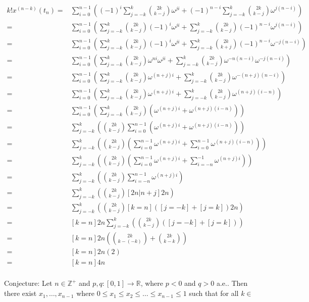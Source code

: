 \documentclass{article}
\begin{document}
\begin{align*}
  k!x^{(n-k)}(t_n) =& \sum_{i=0}^{n-1} \left((-1)^i\sum_{j=-k}^k\binom{2k}{k-j}\omega^{ji} + (-1)^{n-i}\sum_{j=-k}^k\binom{2k}{k-j}\omega^{j(n-i)}\right) \\
  =& \sum_{i=0}^{n-1} \left(\sum_{j=-k}^k\binom{2k}{k-j}(-1)^i\omega^{ji} + \sum_{j=-k}^k\binom{2k}{k-j}(-1)^{n-i}\omega^{j(n-i)}\right) \\
  =& \sum_{i=0}^{n-1} \left(\sum_{j=-k}^k\binom{2k}{k-j}(-1)^i\omega^{ji} + \sum_{j=-k}^k\binom{2k}{k+j}(-1)^{n-i}\omega^{-j(n-i)}\right) \\
  =& \sum_{i=0}^{n-1} \left(\sum_{j=-k}^k\binom{2k}{k-j}\omega^{ni}\omega^{ji} + \sum_{j=-k}^k\binom{2k}{k-j}\omega^{-n(n-i)}\omega^{-j(n-i)}\right) \\
  =& \sum_{i=0}^{n-1} \left(\sum_{j=-k}^k\binom{2k}{k-j}\omega^{(n+j)i} + \sum_{j=-k}^k\binom{2k}{k-j}\omega^{-(n+j)(n-i)}\right) \\
  =& \sum_{i=0}^{n-1} \left(\sum_{j=-k}^k\binom{2k}{k-j}\omega^{(n+j)i} + \sum_{j=-k}^k\binom{2k}{k-j}\omega^{(n+j)(i-n)}\right) \\
  =& \sum_{i=0}^{n-1} \left(\sum_{j=-k}^k\binom{2k}{k-j}\left(\omega^{(n+j)i} + \omega^{(n+j)(i-n)}\right)\right) \\
  =& \sum_{j=-k}^k \left(\binom{2k}{k-j}\sum_{i=0}^{n-1}\left(\omega^{(n+j)i} + \omega^{(n+j)(i-n)}\right)\right) \\
  =& \sum_{j=-k}^k \left(\binom{2k}{k-j}\left(\sum_{i=0}^{n-1}\omega^{(n+j)i} + \sum_{i=0}^{n-1}\omega^{(n+j)(i-n)}\right)\right) \\
  =& \sum_{j=-k}^k \left(\binom{2k}{k-j}\left(\sum_{i=0}^{n-1}\omega^{(n+j)i} + \sum_{i=-n}^{-1}\omega^{(n+j)i}\right)\right) \\
  =& \sum_{j=-k}^k \left(\binom{2k}{k-j}\sum_{i=-n}^{n-1}\omega^{(n+j)i}\right) \\
  =& \sum_{j=-k}^k \left(\binom{2k}{k-j}[2n|n+j]2n\right) \\
  =& \sum_{j=-k}^k \left(\binom{2k}{k-j}[k=n]([j=-k]+[j=k])2n\right) \\
  =& [k=n]2n\sum_{j=-k}^k \left(\binom{2k}{k-j}([j=-k]+[j=k])\right) \\
  =& [k=n]2n\left(\binom{2k}{k-(-k)}+\binom{2k}{k-k}\right) \\
  =& [k=n]2n(2) \\
  =& [k=n]4n \\
\end{align*}

\newpage
Conjecture:
Let $n \in \mathbb{Z}^+$ and $p, q : [0, 1] \rightarrow \mathbb{R}$,
where $p < 0$ and $q > 0$ a.e..
Then there exist $x_1, \ldots, x_{n-1}$ where $0 \leq x_1 \leq x_2 \leq \ldots \leq x_{n-1} \leq 1$ such that for all $k \in$
\end{document}
